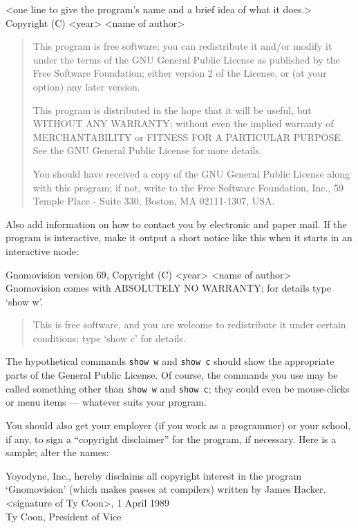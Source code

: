 \begin{center}
  <one line to give the program's name and a brief idea of
  what it does.> \\
  Copyright (C) <year> <name of author>
\end{center}
\begin{quote}
  This program is free software; you can redistribute it
  and/or modify it under the terms of the GNU General Public
  License as published by the Free Software Foundation;
  either version 2 of the License, or (at your option) any
  later version.

  This program is distributed in the hope that it will be
  useful, but WITHOUT ANY WARRANTY; without even the implied
  warranty of MERCHANTABILITY or FITNESS FOR A PARTICULAR
  PURPOSE.  See the GNU General Public License for more
  details.

  You should have received a copy of the GNU General Public
  License along with this program; if not, write to the Free
  Software Foundation, Inc., 59 Temple Place - Suite 330,
  Boston, MA 02111-1307, USA.
\end{quote}

Also add information on how to contact you by electronic and
paper mail.  If the program is interactive, make it output a
short notice like this when it starts in an interactive
mode:

\begin{center}
  Gnomovision version 69, Copyright (C) <year> <name of
  author> \\
  Gnomovision comes with ABSOLUTELY NO WARRANTY; for details
  type `show w'.
\end{center}
\begin{quote}
  This is free software, and you are welcome to redistribute
  it under certain conditions; type `show c' for details.
\end{quote}

The hypothetical commands \texttt{show w} and \texttt{show
  c} should show the appropriate parts of the General Public
License.  Of course, the commands you use may be called
something other than \texttt{show w} and \texttt{show c};
they could even be mouse-clicks or menu items --- whatever
suits your program.

You should also get your employer (if you work as a
programmer) or your school, if any, to sign a ``copyright
disclaimer'' for the program, if necessary.  Here is a
sample; alter the names:

\begin{center}
  Yoyodyne, Inc., hereby disclaims all copyright interest in
  the program \\
  `Gnomovision' (which makes passes at compilers) written by
  James Hacker. \\[1ex]
  <signature of Ty Coon>, 1 April 1989 \\
  Ty Coon, President of Vice
\end{center}


